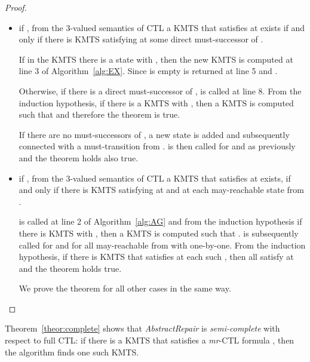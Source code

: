\begin{proof}
\begin{itemize}
\item if , from the 3-valued semantics of CTL a KMTS that satisfies  at  exists if and only if there is KMTS satisfying
 at some direct must-successor of .

If in the KMTS  there is a state  with , then the new KMTS  is computed at line 3 of Algorithm~\ref{alg:EX}.  Since  is empty  is returned at line 5 and .    

Otherwise, if there is a direct must-successor  of ,  is called at line 8.  From the induction hypothesis, if there is a KMTS  with , then a KMTS  is computed such that 
 and therefore the theorem is true.     

If there are no must-successors of , a new state  is added 
and subsequently connected with a must-transition from .   is then
called for  and  as previously and the theorem holds also true.  
 
\item if , from the 3-valued semantics of CTL a KMTS that satisfies  at  exists, if and only if there is KMTS satisfying  at  and at each may-reachable state from .  

 is called at line 2 of Algorithm~\ref{alg:AG} and from the induction hypothesis if there is KMTS  with , then a KMTS  is computed such that 
.   is subsequently called for  and for all may-reachable  from  with  one-by-one.  
From the induction hypothesis, if there is KMTS  that satisfies  at each such , then all  satisfy  at  and the theorem holds true.

We prove the theorem for all other cases in the same way.    

\end{itemize} 
\end{proof}
Theorem~\ref{theor:complete} shows that \emph{AbstractRepair} 
is \emph{semi-complete} with respect to full CTL: if there is a KMTS that satisfies a \emph{mr}-CTL formula , then the algorithm finds one such KMTS.  